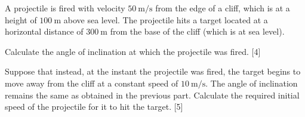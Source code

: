 \begin{problem}
    A projectile is fired with velocity $\qty{50}{\m\per\s}$ from the edge of a cliff, which is at a height of $\qty{100}{\m}$ above sea level. The projectile hits a target located at a horizontal distance of $\qty{300}{\m}$ from the base of the cliff (which is at sea level).
    \begin{subproblem}
        Calculate the angle of inclination at which the projectile was fired.
    \hfill{[4]}\end{subproblem}
    \begin{subproblem}
        Suppose that instead, at the instant the projectile was fired, the target begins to move away from the cliff at a constant speed of $\qty{10}{\m\per\s}$. The angle of inclination remains the same as obtained in the previous part. Calculate the required initial speed of the projectile for it to hit the target.
    \hfill{[5]}\end{subproblem}
\end{problem}

